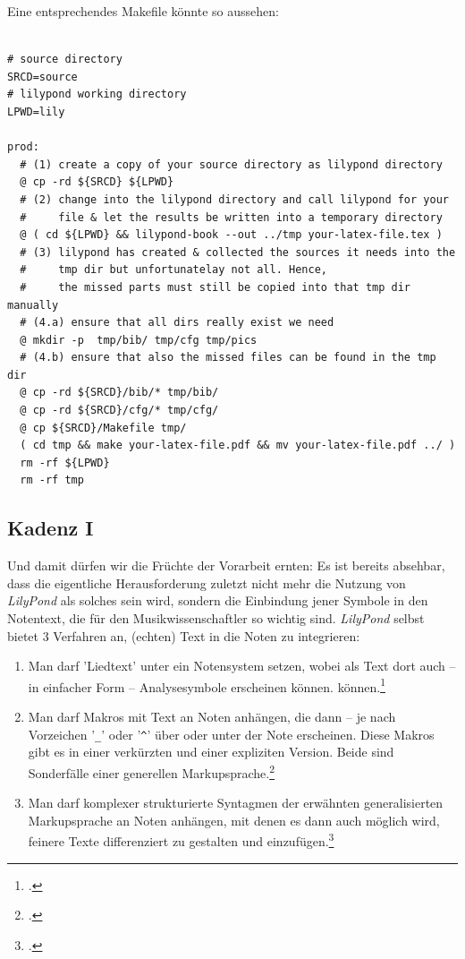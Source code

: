 Eine entsprechendes Makefile könnte so aussehen:

\begin{verbatim}

# source directory
SRCD=source
# lilypond working directory
LPWD=lily

prod: 
  # (1) create a copy of your source directory as lilypond directory 
  @ cp -rd ${SRCD} ${LPWD}
  # (2) change into the lilypond directory and call lilypond for your
  #     file & let the results be written into a temporary directory
  @ ( cd ${LPWD} && lilypond-book --out ../tmp your-latex-file.tex )
  # (3) lilypond has created & collected the sources it needs into the 
  #     tmp dir but unfortunatelay not all. Hence, 
  #     the missed parts must still be copied into that tmp dir manually
  # (4.a) ensure that all dirs really exist we need
  @ mkdir -p  tmp/bib/ tmp/cfg tmp/pics
  # (4.b) ensure that also the missed files can be found in the tmp dir
  @ cp -rd ${SRCD}/bib/* tmp/bib/
  @ cp -rd ${SRCD}/cfg/* tmp/cfg/
  @ cp ${SRCD}/Makefile tmp/
  ( cd tmp && make your-latex-file.pdf && mv your-latex-file.pdf ../ )
  rm -rf ${LPWD}
  rm -rf tmp

\end{verbatim}


\subsection{Kadenz I}
\label{LilyPondKadenzI}
Und damit dürfen wir die Früchte der Vorarbeit ernten: Es ist bereits
absehbar, dass die eigentliche Herausforderung zuletzt nicht mehr die Nutzung
von \textit{LilyPond} als solches sein wird, sondern die Einbindung jener
Symbole in den Notentext, die für den Musikwissenschaftler so wichtig sind.
\textit{LilyPond} selbst bietet 3 Verfahren an, (echten) Text in die Noten zu
integrieren:

\begin{enumerate}
  \item Man darf 'Liedtext' unter ein Notensystem setzen, wobei als Text dort
  auch -- in einfacher Form  -- Analysesymbole erscheinen können.
  können.\footcite[vgl.][31ff]{LilyPond2018b}
  \item Man darf Makros mit Text an Noten anhängen, die dann -- je nach
  Vorzeichen '\texttt{\_}' oder '\texttt{\^}' über oder unter der Note
  erscheinen. Diese Makros gibt es in einer verkürzten und einer expliziten
  Version. Beide sind Sonderfälle einer generellen
  Markupsprache.\footcite[vgl.][211ff]{LilyPond2018c}
  \item Man darf komplexer strukturierte Syntagmen der erwähnten generalisierten
  Markupsprache an Noten anhängen, mit denen es dann auch möglich wird, feinere
  Texte differenziert zu gestalten und
  einzufügen.\footcite[vgl.][218ff]{LilyPond2018c} 
\end{enumerate}

